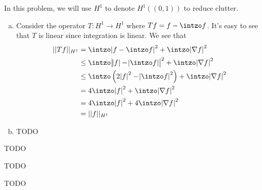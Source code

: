\documentclass{article}
\newcommand{\D}{\nabla}
\begin{document}
\newpage
{} 
 \tri
\hop 
\solution
In this problem, we will use $H^1$ to denote $H^1((0,1))$ to reduce clutter.
\begin{enumerate}[(a)]
    \item Consider the operator $T: H^1 \to H^1$ where $Tf = f - \intzo f$. It's easy to see that $T$ is linear since integration is linear. We see that 
    \begin{align*}
        ||Tf||_{H^1} &= \intzo \abs{f - \intzo f}^2 + \intzo \abs{\D f}^2 \\
        &\le  \intzo \abs{\abs{f} - \abs{\intzo f}}^2 + \intzo \abs{\D f} ^2\\
        &\le  \intzo \del{2\abs{f}^2 - \abs{\intzo f}^2} + \intzo \abs{\D f}^2 \\
        &=  4\intzo \abs{f}^2 + \intzo \abs{\D f}^2 \\
        &=  4\intzo \abs{f}^2 + 4\intzo \abs{\D f}^2 \\
        &= ||f||_{H^1}
    \end{align*}
    \item TODO
\end{enumerate}

\newpage
{} 
 \tri
\hop 
\solution
TODO

\newpage
{} 
 \tri
\hop 
\solution
TODO

\newpage
{} 
 \tri
\hop 
\solution
TODO
\end{document}
